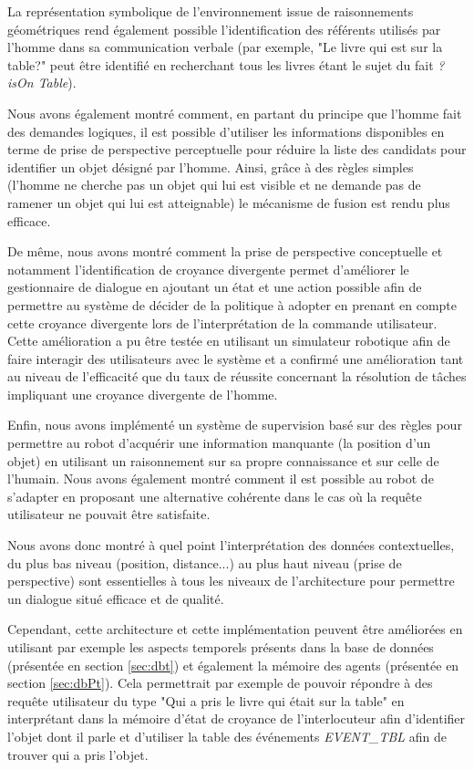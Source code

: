 \documentclass[a4paper,11pt,twoside]{StyleThese}
\begin{document}
La représentation symbolique de l'environnement issue de raisonnements géométriques rend également possible l'identification des référents utilisés par l'homme dans sa communication verbale (par exemple, "Le livre qui est sur la table?" peut être identifié en recherchant tous les livres étant le sujet du fait \textit{? isOn Table}).

Nous avons également montré comment, en partant du principe que l'homme fait des demandes logiques, il est possible d'utiliser les informations disponibles en terme de prise de perspective perceptuelle pour réduire la liste des candidats pour identifier un objet désigné par l'homme.
Ainsi, grâce à des règles simples (l'homme ne cherche pas un objet qui lui est visible et ne demande pas de ramener un objet qui lui est atteignable) le mécanisme de fusion est rendu plus efficace.

De même, nous avons montré comment la prise de perspective conceptuelle et notamment l'identification de croyance divergente permet d'améliorer le gestionnaire de dialogue en ajoutant un état et une action possible afin de permettre au système de décider de la politique à adopter en prenant en compte cette croyance divergente lors de l'interprétation de la commande utilisateur.
Cette amélioration a pu être testée en utilisant un simulateur robotique afin de faire interagir des utilisateurs avec le système et a confirmé une amélioration tant au niveau de l'efficacité que du taux de réussite concernant la résolution de tâches impliquant une croyance divergente de l'homme.

Enfin, nous avons implémenté un système de supervision basé sur des règles pour permettre au robot d'acquérir une information manquante (la position d'un objet) en utilisant un raisonnement sur sa propre connaissance et sur celle de l'humain.
Nous avons également montré comment il est possible au robot de s'adapter en proposant une alternative cohérente dans le cas où la requête utilisateur ne pouvait être satisfaite.


Nous avons donc montré à quel point l'interprétation des données contextuelles, du plus bas niveau (position, distance...) au plus haut niveau (prise de perspective) sont essentielles à tous les niveaux de l'architecture pour permettre un dialogue situé efficace et de qualité.

Cependant, cette architecture et cette implémentation peuvent être améliorées en utilisant par exemple les aspects temporels présents dans la base de données (présentée en section \ref{sec:dbt}) et également la mémoire des agents (présentée en section \ref{sec:dbPt}). Cela permettrait par exemple de pouvoir répondre à des requête utilisateur du type "Qui a pris le livre qui était sur la table" en interprétant dans la mémoire d'état de croyance de l'interlocuteur afin d'identifier l'objet dont il parle et d'utiliser la table des événements  \textit{EVENT\_TBL} afin de trouver qui a pris l'objet.
\end{document}
